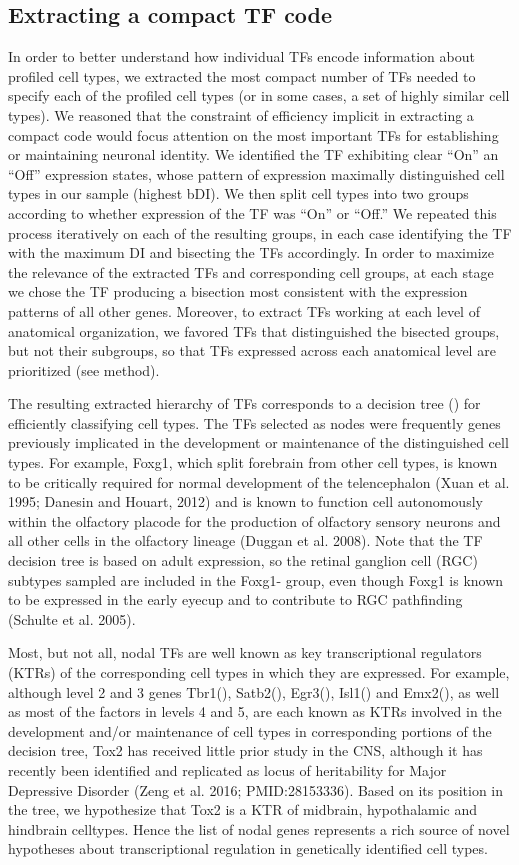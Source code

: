 \subsection{Extracting a compact TF code}
In order to better understand how individual TFs encode information about profiled cell types, we extracted the most compact number of TFs needed to specify each of the profiled cell types (or in some cases, a set of highly similar cell types). We reasoned that the constraint of efficiency implicit in extracting a compact code would focus attention on the most important TFs for establishing or maintaining neuronal identity. We identified the TF exhibiting clear “On” an “Off” expression states, whose pattern of expression maximally distinguished cell types in our sample (highest bDI). We then split cell types into two groups according to whether expression of the TF was “On” or “Off.” We repeated this process iteratively on each of the resulting groups, in each case identifying the TF with the maximum DI and bisecting the TFs accordingly. In order to maximize the relevance of the extracted TFs and corresponding cell groups, at each stage we chose the TF producing a bisection most consistent with the expression patterns of all other genes. Moreover, to extract TFs working at each level of anatomical organization, we favored TFs that distinguished the bisected groups, but not their subgroups, so that TFs expressed across each anatomical level are prioritized (see method).

The resulting extracted hierarchy of TFs corresponds to a decision tree () for efficiently classifying cell types.
The TFs selected as nodes were frequently genes previously implicated in the development or maintenance of the distinguished cell types. For example, Foxg1, which split forebrain from other cell types, is known to be critically required for normal development of the telencephalon (Xuan et al. 1995; Danesin and Houart, 2012) and is known to function cell autonomously within the olfactory placode for the production of olfactory sensory neurons and all other cells in the olfactory lineage (Duggan et al. 2008). Note that the TF decision tree is based on adult expression, so the retinal ganglion cell (RGC) subtypes sampled are included in the Foxg1- group, even though Foxg1 is known to be expressed in the early eyecup and to contribute to RGC pathfinding (Schulte et al. 2005).

Most, but not all, nodal TFs are well known as key transcriptional regulators (KTRs) of the corresponding cell types in which they are expressed. For example, although level 2 and 3 genes Tbr1(), Satb2(), Egr3(), Isl1() and Emx2(), as well as most of the factors in levels 4 and 5, are each known as KTRs involved in the development and/or maintenance of cell types in corresponding portions of the decision tree, Tox2 has received little prior study in the CNS, although it has recently been identified and replicated as locus of heritability for Major Depressive Disorder (Zeng et al. 2016; PMID:28153336). Based on its position in the tree, we hypothesize that Tox2 is a KTR of midbrain, hypothalamic and hindbrain celltypes. Hence the list of nodal genes represents a rich source of novel hypotheses about transcriptional regulation in genetically identified cell types.

